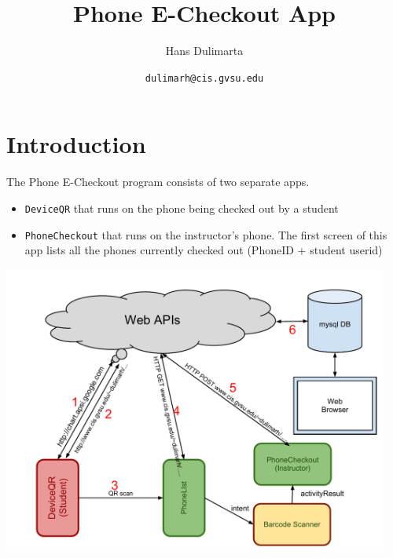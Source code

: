 \documentclass[11pt]{article} %
\title{Phone E-Checkout App}
\author{Hans Dulimarta}
\date{\texttt{dulimarh@cis.gvsu.edu}}
\begin{document}
\maketitle

\section{Introduction}
The Phone E-Checkout program consists of two separate apps.
\begin{itemize}
\item \texttt{DeviceQR} that runs on the phone being checked out by a student
\item \texttt{PhoneCheckout} that runs on the instructor's phone. The
first screen of this app lists all the phones currently checked out
(PhoneID + student userid)
\end{itemize}

\includegraphics[width=5in]{PhoneCheckout}
\end{document}
